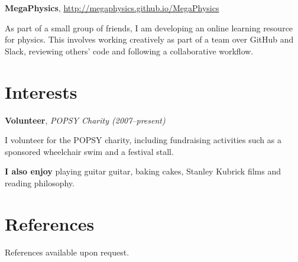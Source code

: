 \documentclass[11pt,a4paper,sans]{moderncv}
\begin{document}
{\large\textbf{MegaPhysics}, \color{blue}
\href{http://megaphysics.github.io/MegaPhysics}{http://megaphysics.github.io/MegaPhysics}}

As part of a small group of friends, I am developing an online learning resource
for physics. This involves working creatively as part of a team over GitHub and
Slack, reviewing others' code and following a collaborative workflow.

\section{Interests}

{\large\textbf{Volunteer}, \textit{POPSY Charity (2007--present)}}

I volunteer for the POPSY charity, including fundraising activities such as a
sponsored wheelchair swim and a festival stall.
    
\vspace{0.75em}

{\large\textbf{I also enjoy}} playing guitar guitar, baking cakes,
Stanley Kubrick films and reading philosophy.

\section{References}

References available upon request.
\end{document}

